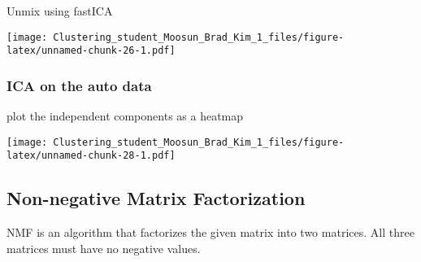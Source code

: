\documentclass[11pt,]{article}
\newenvironment{Shaded}{\begin{snugshade}}{\end{snugshade}}
\newcommand{\DataTypeTok}[1]{\textcolor[rgb]{0.13,0.29,0.53}{#1}}
\newcommand{\DecValTok}[1]{\textcolor[rgb]{0.00,0.00,0.81}{#1}}
\newcommand{\KeywordTok}[1]{\textcolor[rgb]{0.13,0.29,0.53}{\textbf{#1}}}
\newcommand{\NormalTok}[1]{#1}
\newcommand{\OperatorTok}[1]{\textcolor[rgb]{0.81,0.36,0.00}{\textbf{#1}}}
\newcommand{\StringTok}[1]{\textcolor[rgb]{0.31,0.60,0.02}{#1}}
\begin{document}
Unmix using fastICA

\begin{Shaded}
\end{Shaded}

\texttt{[image: Clustering\_student\_Moosun\_Brad\_Kim\_1\_files/figure-latex/unnamed-chunk-26-1.pdf]}

\hypertarget{ica-on-the-auto-data}{%
\subsubsection{ICA on the auto data}\label{ica-on-the-auto-data}}

plot the independent components as a heatmap

\begin{Shaded}
\end{Shaded}

\texttt{[image: Clustering\_student\_Moosun\_Brad\_Kim\_1\_files/figure-latex/unnamed-chunk-28-1.pdf]}

\newpage

\hypertarget{non-negative-matrix-factorization}{%
\subsection{Non-negative Matrix
Factorization}\label{non-negative-matrix-factorization}}

NMF is an algorithm that factorizes the given matrix into two matrices.
All three matrices must have no negative values.
\end{document}
